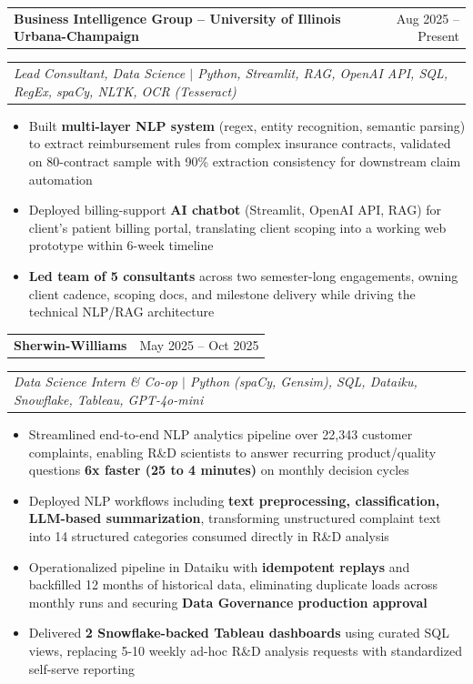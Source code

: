 \documentclass[letterpaper,10pt]{article}
\makeatletter
\newcommand{\resumeItem}[1]{
  \item\small{
    {#1 \vspace{-2pt}}
  }
}
\newcommand{\resumeSubheading}[3]{
  \vspace{-2pt}\item
    \begin{tabular*}{0.97\textwidth}[t]{l@{\extracolsep{\fill}}r}
      \textbf{#1} & #2 \\
    \end{tabular*}
    \vspace{-3pt}
    \begin{tabular*}{0.97\textwidth}[t]{@{}l@{}}
      \textit{\small#3}
    \end{tabular*}\vspace{-7pt}
}
\newcommand{\resumeItemListStart}{\begin{itemize}}
\newcommand{\resumeItemListEnd}{\end{itemize}\vspace{-5pt}}
\makeatother
\begin{document}
    \resumeSubheading
      {Business Intelligence Group -- University of Illinois Urbana-Champaign}{Aug 2025 -- Present}
      {Lead Consultant, Data Science $|$ Python, Streamlit, RAG, OpenAI API, SQL, RegEx, spaCy, NLTK, OCR (Tesseract)}
      \resumeItemListStart
        \resumeItem{Built \textbf{multi-layer NLP system} (regex, entity recognition, semantic parsing) to extract reimbursement rules from complex insurance contracts, validated on 80-contract sample with 90\% extraction consistency for downstream claim automation}
        \resumeItem{Deployed billing-support \textbf{AI chatbot} (Streamlit, OpenAI API, RAG) for client's patient billing portal, translating client scoping into a working web prototype within 6-week timeline}
        \resumeItem{\textbf{Led team of 5 consultants} across two semester-long engagements, owning client cadence, scoping docs, and milestone delivery while driving the technical NLP/RAG architecture}
      \resumeItemListEnd

    \resumeSubheading
      {Sherwin-Williams}{May 2025 -- Oct 2025}
      {Data Science Intern \& Co-op $|$ Python (spaCy, Gensim), SQL, Dataiku, Snowflake, Tableau, GPT-4o-mini}
      \resumeItemListStart
        \resumeItem{Streamlined end-to-end NLP analytics pipeline over 22,343 customer complaints, enabling R\&D scientists to answer recurring product/quality questions \textbf{6x faster (25 to 4 minutes)} on monthly decision cycles}
        \resumeItem{Deployed NLP workflows including \textbf{text preprocessing, classification, LLM-based summarization}, transforming unstructured complaint text into 14 structured categories consumed directly in R\&D analysis}
        \resumeItem{Operationalized pipeline in Dataiku with \textbf{idempotent replays} and backfilled 12 months of historical data, eliminating duplicate loads across monthly runs and securing \textbf{Data Governance production approval}}
        \resumeItem{Delivered \textbf{2 Snowflake-backed Tableau dashboards} using curated SQL views, replacing 5-10 weekly ad-hoc R\&D analysis requests with standardized self-serve reporting}
      \resumeItemListEnd
\end{document}
